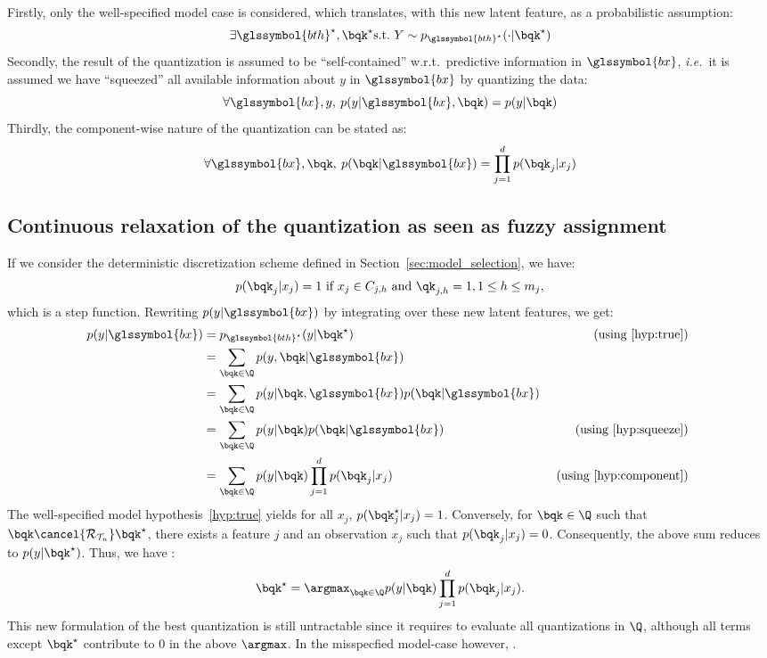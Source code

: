 Firstly, only the well-specified model case is considered, which translates, with this new latent feature, as a probabilistic assumption:
\begin{equation} \label{hyp:true}
\exists \glssymbol{bth}^\star, \bqk^\star \text{s.t.\ } Y \sim p_{\glssymbol{bth}^\star}(\cdot | \bqk^\star)
\end{equation}
Secondly, the result of the quantization is assumed to be ``self-contained'' w.r.t.\ predictive information in $\glssymbol{bx}$, \textit{i.e.}\ it is assumed we have ``squeezed'' all available information about $y$ in $\glssymbol{bx}$ by quantizing the data:
\begin{equation} \label{hyp:squeeze}
\forall \glssymbol{bx},y,\: p(y|\glssymbol{bx},\bqk) = p(y|\bqk)
\end{equation}
Thirdly, the component-wise nature of the quantization can be stated as:
\begin{equation} \label{hyp:component}
\forall \glssymbol{bx},\bqk,\: p(\bqk|\glssymbol{bx}) = \prod_{j=1}^d p(\bqk_j | x_j)
\end{equation}



\subsection{Continuous relaxation of the quantization as seen as fuzzy assignment}

If we consider the deterministic discretization scheme defined in Section~\ref{sec:model_selection}, we have:
$$
p(\bqk_j | x_j) = 1 \text{ if } x_j \in C_{j,h} \text{ and } \qk_{j,h} = 1, 1 \leq h \leq m_j,
$$
which is a step function. Rewriting $p(y| \glssymbol{bx})$ by integrating over these new latent features,
we get:
\begin{align*}
p(y | \glssymbol{bx}) & = p_{\glssymbol{bth}^\star}(y | \bqk^\star) & \text{ (using \ref{hyp:true}) } \\
& = \sum_{\bqk \in \Q} p(y, \bqk | \glssymbol{bx}) \\
& = \sum_{\bqk \in \Q} p(y | \bqk, \glssymbol{bx}) p(\bqk | \glssymbol{bx}) \\
& = \sum_{\bqk \in \Q} p(y | \bqk) p(\bqk | \glssymbol{bx}) & \text{ (using \ref{hyp:squeeze}) } \\
& = \sum_{\bqk \in \Q} p(y | \bqk) \prod_{j=1}^d p(\bqk_j | x_j) & \text{ (using \ref{hyp:component}) }
\end{align*}
The well-specified model hypothesis~\ref{hyp:true} yields for all $x_j$, $p(\bqk_j^\star | x_j) = 1$. Conversely, for $\bqk \in \Q$ such that $\bqk \cancel{\mathcal{R}_{\mathcal{T}_n}} \bqk^\star$, there exists a feature $j$ and an observation $x_j$ such that $p(\bqk_j | x_j) = 0$. Consequently, the above sum reduces to $p(y | \bqk^\star)$. Thus, we have :
\[ \bqk^\star = \argmax_{\bqk \in \Q} p(y|\bqk) \prod_{j=1}^d p(\bqk_j | x_j). \]
This new formulation of the best quantization is still untractable since it requires to evaluate all quantizations in $\Q$, although all terms except $\bqk^\star$ contribute to $0$ in the above $\argmax$. In the misspecfied model-case however, .


